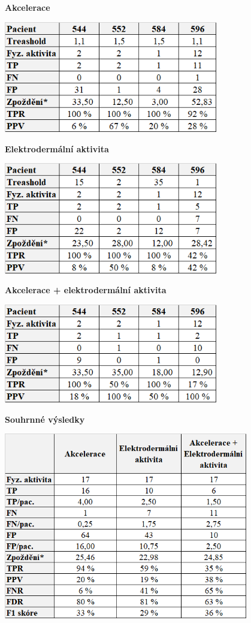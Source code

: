 \begin{table}[H]
\caption{\textbf{Akcelerace}}
\vspace*{1mm}
\label{tab:vys:acc}
\centering
\includegraphics[width=0.7\textwidth]{img/vysledky/pa/7_acc.png}
\end{table}

\begin{table}[H]
\caption{\textbf{Elektrodermální aktivita}}
\vspace*{1mm}
\centering
\includegraphics[width=0.7\textwidth]{img/vysledky/pa/8_electro2.png}
\end{table}

\begin{table}[H]
\caption{\textbf{Akcelerace + elektrodermální aktivita}}
\label{tab:vys:acc+}
\centering
\includegraphics[width=0.7\textwidth]{img/vysledky/pa/9_acc_electro.png}
\end{table}

\begin{table}[H]
\caption{\textbf{Souhrnné výsledky}}
\label{tab:vys:sum_acc}
\centering
\includegraphics[width=0.8\textwidth]{img/vysledky/pa/vysledky 2.png}
\end{table}

